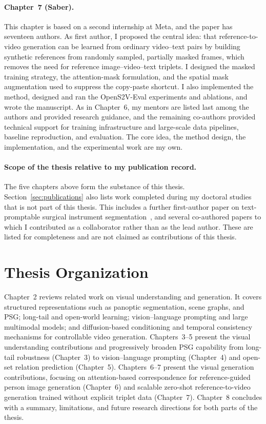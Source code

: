 \paragraph{Chapter~7 (Saber).}
This chapter is based on a second internship at Meta, and the paper has seventeen authors. As first author, I proposed the central idea: that reference-to-video generation can be learned from ordinary video--text pairs by building synthetic references from randomly sampled, partially masked frames, which removes the need for reference image--video--text triplets. I designed the masked training strategy, the attention-mask formulation, and the spatial mask augmentation used to suppress the copy-paste shortcut. I also implemented the method, designed and ran the OpenS2V-Eval experiments and ablations, and wrote the manuscript. As in Chapter~6, my mentors are listed last among the authors and provided research guidance, and the remaining co-authors provided technical support for training infrastructure and large-scale data pipelines, baseline reproduction, and evaluation. The core idea, the method design, the implementation, and the experimental work are my own.

\paragraph{Scope of the thesis relative to my publication record.}
The five chapters above form the substance of this thesis. Section~\ref{sec:publications} also lists work completed during my doctoral studies that is not part of this thesis. This includes a further first-author paper on text-promptable surgical instrument segmentation~\citep{zhou2023text}, and several co-authored papers to which I contributed as a collaborator rather than as the lead author. These are listed for completeness and are not claimed as contributions of this thesis.

\section{Thesis Organization}
Chapter~2 reviews related work on visual understanding and generation. It covers structured representations such as panoptic segmentation, scene graphs, and PSG; long-tail and open-world learning; vision--language prompting and large multimodal models; and diffusion-based conditioning and temporal consistency mechanisms for controllable video generation.
Chapters~3--5 present the visual understanding contributions and progressively broaden PSG capability from long-tail robustness (Chapter~3) to vision--language prompting (Chapter~4) and open-set relation prediction (Chapter~5).
Chapters~6--7 present the visual generation contributions, focusing on attention-based correspondence for reference-guided person image generation (Chapter~6) and scalable zero-shot reference-to-video generation trained without explicit triplet data (Chapter~7).
Chapter~8 concludes with a summary, limitations, and future research directions for both parts of the thesis.

